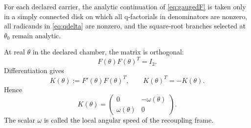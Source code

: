 \begin{assumption}
For each declared carrier, the analytic continuation of \eqref{eq:gaugedF} is taken only in a simply connected disk on which all q-factorials in denominators are nonzero, all radicands in \eqref{eq:qdelta} are nonzero, and the square-root branches selected at $\theta_0$ remain analytic.
\end{assumption}

At real $\theta$ in the declared chamber, the matrix is orthogonal:
\begin{equation}
F(\theta)F(\theta)^T=I_2.
\label{eq:orthogonality}
\end{equation}
Differentiation gives
\begin{equation}
K(\theta):=F'(\theta)F(\theta)^T,
\qquad
K(\theta)^T=-K(\theta).
\label{eq:generator}
\end{equation}
Hence
\begin{equation}
K(\theta)=
\begin{pmatrix}
0&-\omega(\theta)\\
\omega(\theta)&0
\end{pmatrix}.
\label{eq:omega}
\end{equation}
The scalar $\omega$ is called the local angular speed of the recoupling frame.
